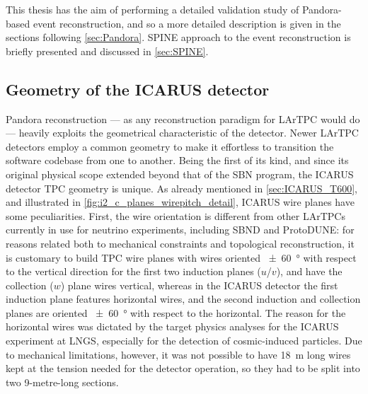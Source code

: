 This thesis has the aim of performing a detailed validation study of Pandora-based event reconstruction, and so a more detailed description is given in the sections following \autoref{sec:Pandora}. SPINE approach to the event reconstruction is briefly presented and discussed in \autoref{sec:SPINE}.

\subsection{Geometry of the ICARUS detector}

Pandora reconstruction --- as any reconstruction paradigm for LArTPC would do --- heavily exploits the geometrical characteristic of the detector. Newer LArTPC detectors employ a common geometry to make it effortless to transition the software codebase from one to another. Being the first of its kind, and since its original physical scope extended beyond that of the SBN program, the ICARUS detector TPC geometry is unique. As already mentioned in \autoref{sec:ICARUS_T600}, and illustrated in \autoref{fig:i2_c_planes_wirepitch_detail}, ICARUS wire planes have some peculiarities. First, the wire orientation is different from other LArTPCs currently in use for neutrino experiments, including SBND and ProtoDUNE: for reasons related both to mechanical constraints and topological reconstruction, it is customary to build TPC wire planes with wires oriented \SI{+-60}{\degree} with respect to the vertical direction for the first two induction planes ($u$/$v$), and have the collection ($w$) plane wires vertical, whereas in the ICARUS detector the first induction plane features horizontal wires, and the second induction and collection planes are oriented \SI{+-60}{\degree} with respect to the horizontal. The reason for the horizontal wires was dictated by the target physics analyses for the ICARUS experiment at LNGS, especially for the detection of cosmic-induced particles. Due to mechanical limitations, however, it was not possible to have \SI{18}{\metre} long wires kept at the tension needed for the detector operation, so they had to be split into two 9-metre-long sections. 

